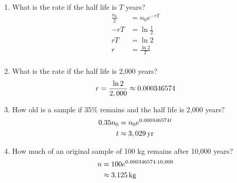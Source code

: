 \documentclass{exam}
\begin{document}
  \begin{enumerate}
    \item What is the rate if the half life is $T$ years?
      \begin{align*}
        \frac{n_0}{2} &= n_0 e^{-rT} \\
        -rT           &= \ln \frac{1}{2} \\
        rT            &= \ln 2 \\
        r             &= \frac{\ln 2}{T} \\
      \end{align*}

    \item What is the rate if the half life is 2,000 years?
      \[
        r = \frac{\ln 2}{2,000} \approx 0.000346574 \\
      \]

    \item How old is a sample if 35\% remains and the half life is 2,000 years?
      \begin{align*}
        0.35 n_0 & = n_0 e^{0.000346574 t} \\
        t        & \approx \unit[3,029]{yr} \\
      \end{align*}

    \item How much of an original sample of 100 kg remains after 10,000 years?
      \begin{align*}
        n & = 100 e^{0.000346574 \cdot 10,000} \\
          & \approx \unit[3.125]{kg} \\
      \end{align*}
  \end{enumerate}
\end{document}
